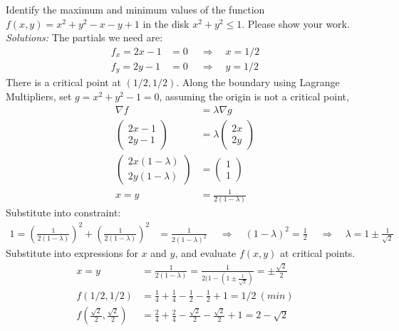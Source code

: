 \ifnum {}
    \question[6] Identify the maximum and minimum values of the function $f(x,y) = x^2 + y^2 -x -y + 1$ in the disk $x^2+y^2 \le 1$. Please show your work. 
    \ifnum {} {\color{DarkBlue} \\ \textit{Solutions:} The partials we need are: 
    \begin{align*}
        f_x = 2x-1 &=0 \ \quad \Rightarrow \quad x= 1/2 \\
        f_y = 2y-1 &=0 \ \quad \Rightarrow \quad y= 1/2 
    \end{align*}
    There is a critical point at $(1/2,1/2)$. Along the boundary using Lagrange Multipliers, set $g = x^2 + y^2 -1 = 0$, assuming the origin is not a critical point,
    \begin{align*}
        \nabla f &= \lambda \nabla g \\
        \begin{pmatrix} 2x-1 \\ 2y-1 \end{pmatrix} &= \lambda \begin{pmatrix} 2x\\2y \end{pmatrix} \\ 
        \begin{pmatrix} 2x(1-\lambda) \\ 2y(1- \lambda) \end{pmatrix} &= \begin{pmatrix} 1 \\ 1 \end{pmatrix} \\
        x=y&=\frac{1}{2(1-\lambda)}
    \end{align*}
    Substitute into constraint: 
    \begin{align*}
        1=(\frac{1}{2(1-\lambda)})^2 + (\frac{1}{2(1-\lambda)})^2 &= \frac{1}{2(1-\lambda)^2}\ \quad \Rightarrow \quad (1-\lambda)^2 = \frac{1}{2} \ \quad \Rightarrow \quad
        \lambda = 1 \pm \frac1{\sqrt2}
    \end{align*}
    Substitute into expressions for $x$ and $y$, and evaluate $f(x,y)$ at critical points.
    \begin{align*}
        x=y&=\frac{1}{2(1-\lambda)} = \frac{1}{2(1- ( 1 \pm \frac1{\sqrt2})} =  \pm \frac{\sqrt2}{2}\\
        f(1/2,1/2) &= \frac14+\frac14-\frac12-\frac12+1 = 1/2 \ (min)\\
        f(\frac{\sqrt2}{2},\frac{\sqrt2}{2}) &= \frac24 + \frac24 - \frac{\sqrt2}{2}-\frac{\sqrt2}{2} + 1 = 2-\sqrt2 \\

\end{align*}}
